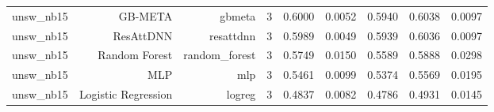 \begin{table}[t]
{\begin{tabular}{lrrrrrrrr}
unsw_nb15 & GB-META & gbmeta & 3 & 0.6000 & 0.0052 & 0.5940 & 0.6038 & 0.0097 \\
unsw_nb15 & ResAttDNN & resattdnn & 3 & 0.5989 & 0.0049 & 0.5939 & 0.6036 & 0.0097 \\
unsw_nb15 & Random Forest & random_forest & 3 & 0.5749 & 0.0150 & 0.5589 & 0.5888 & 0.0298 \\
unsw_nb15 & MLP & mlp & 3 & 0.5461 & 0.0099 & 0.5374 & 0.5569 & 0.0195 \\
unsw_nb15 & Logistic Regression & logreg & 3 & 0.4837 & 0.0082 & 0.4786 & 0.4931 & 0.0145 \\
\bottomrule
\end{tabular}
}
\end{table}
